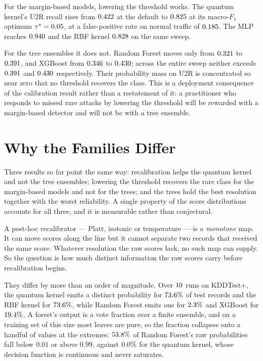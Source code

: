 \documentclass[journal]{IEEEtran}
\begin{document}
For the margin-based models, lowering the threshold works. The quantum
kernel's U2R recall rises from $0.422$ at the default to
$0.825$ at its macro-$F_1$ optimum $\tau^{\ast}=0.05$,
at a false-positive rate on normal traffic of $0.185$. The MLP reaches
$0.940$ and the RBF kernel $0.828$ on the same
sweep.

For the tree ensembles it does not. Random Forest moves only from
$0.321$ to $0.391$, and XGBoost from
$0.346$ to $0.430$; across the entire sweep neither
exceeds $0.391$ and $0.430$ respectively. Their
probability mass on U2R is concentrated so near zero that no threshold
recovers the class. This is a deployment consequence of the calibration
result rather than a restatement of it: a practitioner who responds to
missed rare attacks by lowering the threshold will be rewarded with a
margin-based detector and will not be with a tree ensemble.

\section{Why the Families Differ}\label{sec:mechanism}

Three results so far point the same way: recalibration helps the quantum
kernel and not the tree ensembles; lowering the threshold recovers the rare
class for the margin-based models and not for the trees; and the trees hold
the best resolution together with the worst reliability. A single property
of the score distributions accounts for all three, and it is measurable
rather than conjectural.

A post-hoc recalibrator --- Platt, isotonic or temperature --- is a
\emph{monotone} map. It can move scores along the line but it cannot
separate two records that received the same score. Whatever resolution the
raw scores lack, no such map can supply. So the question is how much
distinct information the raw scores carry before recalibration begins.

They differ by more than an order of magnitude. Over $10$ runs on
KDDTest+, the quantum kernel emits a distinct probability for
$73.6\%$ of test records and the RBF kernel for
$73.6\%$, while Random Forest emits one for $2.3\%$
and XGBoost for $19.4\%$. A forest's output is a vote fraction
over a finite ensemble, and on a training set of this size most leaves are
pure, so the fraction collapses onto a handful of values at the extremes:
$53.8\%$ of Random Forest's raw probabilities fall below $0.01$ or
above $0.99$, against $0.0\%$ for the quantum kernel, whose
decision function is continuous and never saturates.
\end{document}
